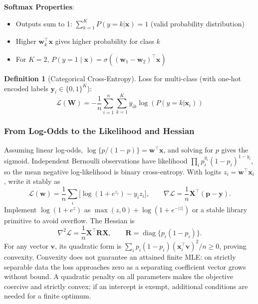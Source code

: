 \documentclass[11pt,twoside]{article}
\numberwithin{equation}{section}
\newcommand{\vect}[1]{\bm{#1}}
\newcommand{\mat}[1]{\bm{#1}}
\newcommand{\Loss}{\mathcal{L}}
\theoremstyle{plain}
\theoremstyle{definition}
\newtheorem{definition}[theorem]{Definition}
\theoremstyle{remark}
\newenvironment{keyidea}{
  \begin{tcolorbox}[colback=yellow!5!white,
                    colframe=yellow!50!black,
                    title=Key Idea,
                    breakable,
                    enhanced,
                    sharp corners,
                    boxrule=0.8pt,
                    left=6pt, right=6pt, top=6pt, bottom=6pt]
}{
  \end{tcolorbox}
}
\begin{document}
\begin{keyidea}
\textbf{Softmax Properties}:
\begin{itemize}
\item Outputs sum to 1: $\sum_{k=1}^K P(y=k|\vect{x}) = 1$ (valid probability distribution)
\item Higher $\vect{w}_k^\top\vect{x}$ gives higher probability for class $k$
\item For $K=2$, $P(y=1\mid\vect{x})=\sigma((\vect{w}_1-\vect{w}_2)^\top\vect{x})$
\end{itemize}
\end{keyidea}

\begin{definition}[Categorical Cross-Entropy]
Loss for multi-class (with one-hot encoded labels $\vect{y}_i \in \{0,1\}^K$):
\[
\Loss(\mat{W}) = -\frac{1}{n}\sum_{i=1}^n \sum_{k=1}^K y_{ik} \log(P(y=k|\vect{x}_i))
\]
\end{definition}

\subsubsection{From Log-Odds to the Likelihood and Hessian}
Assuming linear log-odds, $\log\{p/(1-p)\}=\vect w^\top\vect x$, and solving for $p$ gives the sigmoid. Independent Bernoulli observations have likelihood $\prod_i p_i^{y_i}(1-p_i)^{1-y_i}$, so the mean negative log-likelihood is binary cross-entropy. With logits $z_i=\vect w^\top\vect x_i$, write it stably as
\[
\Loss(\vect w)=\frac1n\sum_i\bigl[\log(1+e^{z_i})-y_i z_i\bigr],\qquad
\nabla\Loss=\frac1n\mat X^\top(\vect p-\vect y).
\]
Implement $\log(1+e^z)$ as $\max(z,0)+\log(1+e^{-|z|})$ or a stable library primitive to avoid overflow. The Hessian is
\[
\nabla^2\Loss=\frac1n\mat X^\top\mat R\mat X,\qquad
\mat R=\operatorname{diag}\{p_i(1-p_i)\}.
\]
For any vector $\vect v$, its quadratic form is $\sum_i p_i(1-p_i)(\vect x_i^\top\vect v)^2/n\ge0$, proving convexity. Convexity does not guarantee an attained finite MLE: on strictly separable data the loss approaches zero as a separating coefficient vector grows without bound. A quadratic penalty on all parameters makes the objective coercive and strictly convex; if an intercept is exempt, additional conditions are needed for a finite optimum.
\end{document}
